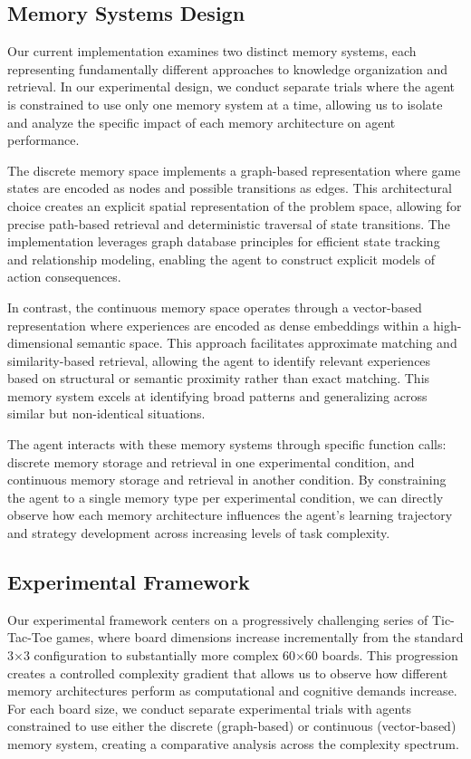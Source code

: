 \documentclass{article}
\begin{document}
\subsection{Memory Systems Design}

Our current implementation examines two distinct memory systems, each representing fundamentally different approaches to knowledge organization and retrieval. In our experimental design, we conduct separate trials where the agent is constrained to use only one memory system at a time, allowing us to isolate and analyze the specific impact of each memory architecture on agent performance.

The discrete memory space implements a graph-based representation where game states are encoded as nodes and possible transitions as edges. This architectural choice creates an explicit spatial representation of the problem space, allowing for precise path-based retrieval and deterministic traversal of state transitions. The implementation leverages graph database principles for efficient state tracking and relationship modeling, enabling the agent to construct explicit models of action consequences.

In contrast, the continuous memory space operates through a vector-based representation where experiences are encoded as dense embeddings within a high-dimensional semantic space. This approach facilitates approximate matching and similarity-based retrieval, allowing the agent to identify relevant experiences based on structural or semantic proximity rather than exact matching. This memory system excels at identifying broad patterns and generalizing across similar but non-identical situations.

The agent interacts with these memory systems through specific function calls: discrete memory storage and retrieval in one experimental condition, and continuous memory storage and retrieval in another condition. By constraining the agent to a single memory type per experimental condition, we can directly observe how each memory architecture influences the agent's learning trajectory and strategy development across increasing levels of task complexity.

\subsection{Experimental Framework}

Our experimental framework centers on a progressively challenging series of Tic-Tac-Toe games, where board dimensions increase incrementally from the standard 3×3 configuration to substantially more complex 60×60 boards. This progression creates a controlled complexity gradient that allows us to observe how different memory architectures perform as computational and cognitive demands increase. For each board size, we conduct separate experimental trials with agents constrained to use either the discrete (graph-based) or continuous (vector-based) memory system, creating a comparative analysis across the complexity spectrum.
\end{document}

